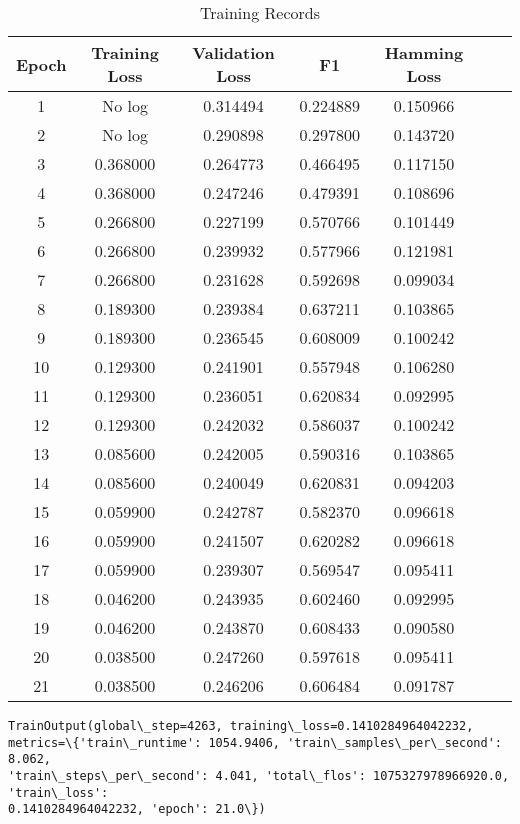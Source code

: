\documentclass[../main.tex]{subfiles}
\begin{document}
\begin{table}[htbp]
    \centering
    \caption{Training Records}
    \label{table:1}
    \begin{tabular}{ccccccc}
        \toprule
        Epoch & Training Loss & Validation Loss & F1 & Hamming Loss \\
        \midrule
        1 & No log & 0.314494 & 0.224889 & 0.150966 \\
        2 & No log & 0.290898 & 0.297800 & 0.143720 \\
        3 & 0.368000 & 0.264773 & 0.466495 & 0.117150 \\
        4 & 0.368000 & 0.247246 & 0.479391 & 0.108696 \\
        5 & 0.266800 & 0.227199 & 0.570766 & 0.101449 \\
        6 & 0.266800 & 0.239932 & 0.577966 & 0.121981 \\
        7 & 0.266800 & 0.231628 & 0.592698 & 0.099034 \\
        8 & 0.189300 & 0.239384 & 0.637211 & 0.103865 \\
        9 & 0.189300 & 0.236545 & 0.608009 & 0.100242 \\
        10 & 0.129300 & 0.241901 & 0.557948 & 0.106280 \\
        11 & 0.129300 & 0.236051 & 0.620834 & 0.092995 \\
        12 & 0.129300 & 0.242032 & 0.586037 & 0.100242 \\
        13 & 0.085600 & 0.242005 & 0.590316 & 0.103865 \\
        14 & 0.085600 & 0.240049 & 0.620831 & 0.094203 \\
        15 & 0.059900 & 0.242787 & 0.582370 & 0.096618 \\
        16 & 0.059900 & 0.241507 & 0.620282 & 0.096618 \\
        17 & 0.059900 & 0.239307 & 0.569547 & 0.095411 \\
        18 & 0.046200 & 0.243935 & 0.602460 & 0.092995 \\
        19 & 0.046200 & 0.243870 & 0.608433 & 0.090580 \\
        20 & 0.038500 & 0.247260 & 0.597618 & 0.095411 \\
        21 & 0.038500 & 0.246206 & 0.606484 & 0.091787 \\
        \bottomrule
    \end{tabular}
\end{table} 

    
\begin{tcolorbox}[breakable, size=fbox, boxrule=.5pt, pad at break*=1mm, opacityfill=0]
\begin{Verbatim}[commandchars=\\\{\}]
TrainOutput(global\_step=4263, training\_loss=0.1410284964042232,
metrics=\{'train\_runtime': 1054.9406, 'train\_samples\_per\_second': 8.062,
'train\_steps\_per\_second': 4.041, 'total\_flos': 1075327978966920.0, 'train\_loss':
0.1410284964042232, 'epoch': 21.0\})
\end{Verbatim}
\end{tcolorbox}
        
\end{document}
